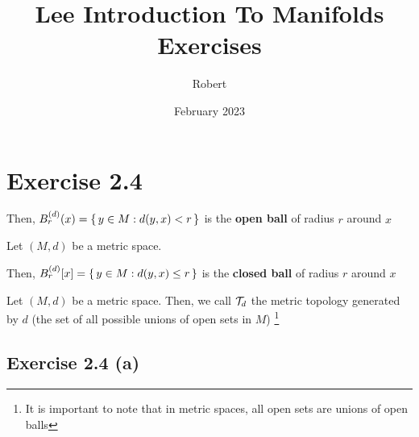 \documentclass{article}
\title{Lee Introduction To Manifolds Exercises}
\author{Robert}
\date{February 2023}
\begin{document}
\maketitle

\section{Exercise 2.4}

\begin{definition}

Then, 
$ B_{r}^{(d)} (x)  = \set{y \in M : d(y, x) < r}$ is the \textbf{open ball} of radius $r$ around $x$ 
\end{definition}

\begin{definition}
Let $(M, d)$ be a metric space.

Then, 
$ B_{r}^{(d)} [x]  = \set{y \in M : d(y, x) \leq r}$ is the \textbf{closed ball} of radius $r$ around $x$ 
\end{definition}

\begin{definition}
    Let $(M, d)$ be a metric space. Then, we call $\mathcal{T}_d$ the metric topology generated
    by $d$ (the set of all possible unions of open sets in $M$)
    \footnote{It is important to note that in metric spaces, all open sets are unions of open balls}
\end{definition}

\subsection{Exercise 2.4 (a)}
\end{document}
